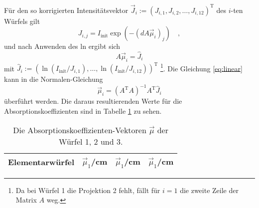 Für den so korrigierten Intensitätsvektor $\vec{J}_i:=(J_{i,1},J_{i,2},\ldots,J_{i,12})^\text{T}$ 
des $i$-ten Würfels gilt
\begin{equation}
J_{i,j}=I_\text{init}\exp\left(- (d A \vec{\mu}_i)_j \right) \quad ,
\end{equation}
und nach Anwenden des ln ergibt sich
\begin{equation}
A \vec{\mu}_i = \hat{J}_i \label{eq:linear}
\end{equation}
mit $\hat{J}_i:=(\ln(I_\text{init}/J_{i,1}),\ldots,\ln(I_\text{init}/J_{i,12}))^\text{T}$ 
  \footnote{
Da bei Würfel 1 die Projektion 2 fehlt, fällt für $i=1$ die zweite Zeile der Matrix $A$ weg.}. 
Die Gleichung \eqref{eq:linear} kann in die Normalen-Gleichung
\begin{equation}
\vec{\mu}_i = \left( A^\text{T}A \right)^{-1} A^\text{T} \hat{J}_i
\end{equation}
überführt werden. Die daraus resultierenden Werte für die Absorptionskoeffizienten sind in 
Tabelle \ref{tab:Koeff} zu sehen.
\begin{table}[h]
\centering
\begin{tabular}{cccc}
\toprule
\midrule
Elementarwürfel & $\vec{\mu}_1$/cm & $\vec{\mu}_1$/cm & $\vec{\mu}_1$/cm \\
\midrule

\midrule
\bottomrule
\end{tabular}
\caption{Die Absorptionskoeffizienten-Vektoren $\vec{\mu}$ der Würfel 1, 2 und 3.}
\label{tab:Koeff}
\end{table}